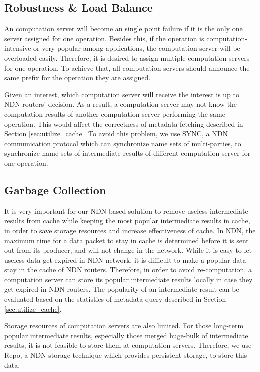 \documentclass[journal]{IEEEtran}
\begin{document}
\subsection{Robustness \& Load Balance} \label{sec:robust}
An computation server will become an single point failure if it is the only one
server assigned for one operation.  Besides this, if the operation is
computation-intensive or very popular among applications, the computation server
will be overloaded easily.  Therefore, it is desired to assign multiple
computation servers for one operation.  To achieve that, all computation servers
should announce the same prefix for the operation they are assigned.  

Given an {\sc interest}, which computation server will receive the {\sc
  interest} is up to NDN routers' decision.  As a result, a computation server
may not know the computation results of another computation server performing
the same operation.  This would affect the correctness of metadata fetching
described in Section \ref{sec:utilize_cache}.  To avoid this problem, we use
SYNC, a NDN communication protocol which can synchronize name sets of
multi-parties, to synchronize name sets of intermediate results of different
computation server for one operation. 
\subsection{Garbage Collection} \label{sec:gg}
It is very important for our NDN-based solution to remove useless intermediate
results from cache while keeping the most popular intermediate results in cache,
in order to save storage resources and increase effectiveness of cache.  In NDN,
the maximum time for a {\sc data} packet to stay in cache is determined before
it is sent out from its producer, and will not change in the network.  While it
is easy to let useless {\sc data} get expired in NDN network, it is difficult to
make a popular {\sc data} stay in the cache of NDN routers.  Therefore, in order
to avoid re-computation, a computation server can store its popular intermediate
results locally in case they get expired in NDN routers.  The popularity of an
intermediate result can be evaluated based on the statistics of metadata query
described in Section \ref{sec:utilize_cache}.

Storage resources of computation servers are also limited. For those long-term
popular intermediate results, especially those merged huge-bulk of intermediate
results, it is not feasible to store them at computation servers.  Therefore, we
use Repo, a NDN storage technique which provides persistent storage, to store
this data.
\end{document}
